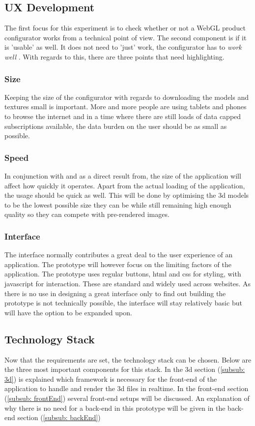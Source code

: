 \subsection{UX Development}
The first focus for this experiment is to check whether or not a WebGL product configurator works from a technical point of view. The second component is if it is 'usable' as well. It does not need to 'just' work, the configurator has to \textit{work well} . With regards to this, there are three points that need highlighting.
\subsubsection{Size}
Keeping the size of the configurator with regards to downloading the models and textures small is important. More and more people are using tablets and phones to browse the internet and in a time where there are still loads of data capped subscriptions available, the data burden on the user should be as small as possible.

\subsubsection{Speed}
In conjunction with and as a direct result from, the size of the application will affect how quickly it operates. Apart from the actual loading of the application, the usage should be quick as well. This will be done by optimising the 3d models to be the lowest possible size they can be while still remaining high enough quality so they can compete with pre-rendered images.

\subsubsection{Interface}
The interface normally contributes a great deal to the user experience of an application. The prototype will however focus on the limiting factors of the application. The prototype uses regular buttons, html and css for styling, with javascript for interaction. These are standard and widely used across websites. As there is no use in designing a great interface only to find out building the prototype is not technically possible, the interface will stay relatively basic but will have the option to be expanded upon.

\subsection{Technology Stack}
Now that the requirements are set, the technology stack can be chosen. Below are the three most important components for this stack. In the 3d section (\ref{subsub: 3d}) is explained which framework is necessary for the front-end of the application to handle and render the 3d files in realtime. In the front-end section (\ref{subsub: frontEnd}) several front-end setups will be discussed. An explanation of why there is no need for a back-end in this prototype will be given in the back-end section (\ref{subsub: backEnd})

